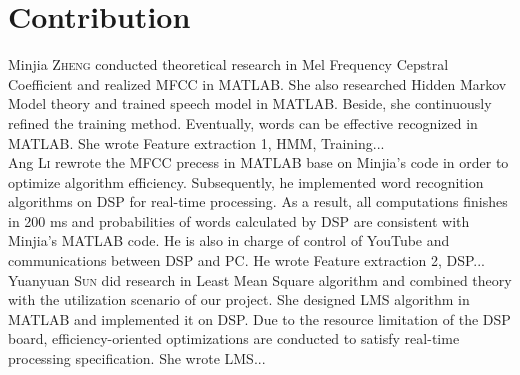 \chapter*{Contribution}

Minjia \textsc{Zheng} conducted theoretical research in Mel Frequency Cepstral Coefficient and realized MFCC in MATLAB. She also researched Hidden Markov Model theory and trained speech model in MATLAB. Beside, she continuously refined the training method. Eventually, words can be effective recognized in MATLAB. She wrote Feature extraction 1, HMM, Training...\\

Ang \textsc{Li} rewrote the MFCC precess in MATLAB base on Minjia's code in order to optimize algorithm efficiency. Subsequently, he implemented word recognition algorithms on DSP for real-time processing. As a result, all computations finishes in 200 ms and probabilities of words calculated by DSP are consistent with Minjia's MATLAB code. He is also in charge of control of YouTube and communications between DSP and PC. He wrote Feature extraction 2, DSP...\\

Yuanyuan \textsc{Sun} did research in Least Mean Square algorithm and combined theory with the utilization scenario of our project. She designed LMS algorithm in MATLAB and implemented it on DSP. Due to the resource limitation of the DSP board, efficiency-oriented optimizations are conducted to satisfy real-time processing specification. She wrote LMS...
